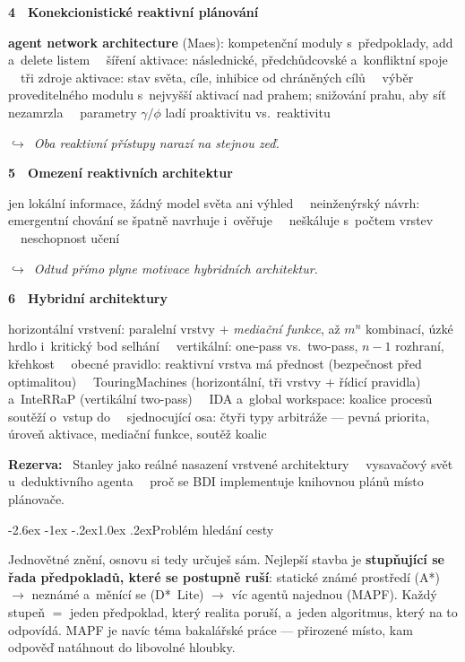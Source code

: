 \documentclass[11pt,a4paper]{article}
\makeatletter
\newcommand{\tb}{\ \textcolor{defframe}{\textbullet}\ }
\newcommand{\blok}[2]{\par\addvspace{2.4mm}\noindent
  \textcolor{blokcol}{\textbf{#1}}\ \ \textbf{#2}\par\nobreak}
\newcommand{\tema}[1]{\par\nobreak\noindent #1\par}
\newcommand{\most}[1]{\par\nobreak\noindent
  {\small\itshape\textcolor{mostcol}{$\hookrightarrow$\ #1}}\par}
\newcommand{\lbl}[1]{\par\addvspace{1.8mm}\noindent
  \textcolor{markcol}{\textbf{\small #1}}\ \ignorespaces}
\newcommand{\zneni}[1]{\par\nobreak\vspace{-1.2mm}\noindent
  {\small\itshape\uv{#1}}\par\addvspace{1.2mm}}
\renewcommand\section{\@startsection{section}{1}{\z@}%
  {-2.6ex \@plus -1ex \@minus -.2ex}{1.0ex \@plus.2ex}{\normalfont\Large\bfseries}}
\makeatother
\begin{document}
\blok{4}{Konekcionistické reaktivní plánování}
\tema{\textbf{agent network architecture} (Maes): kompetenční moduly s~předpoklady, add
a~delete listem
\tb šíření aktivace: následnické, předchůdcovské a~konfliktní spoje
\tb tři zdroje aktivace: stav světa, cíle, inhibice od chráněných cílů
\tb výběr proveditelného modulu s~nejvyšší aktivací nad prahem; snižování prahu, aby síť
nezamrzla
\tb parametry $\gamma/\phi$ ladí proaktivitu vs.\ reaktivitu}
\most{Oba reaktivní přístupy narazí na stejnou zeď.}

\blok{5}{Omezení reaktivních architektur}
\tema{jen lokální informace, žádný model světa ani výhled
\tb neinženýrský návrh: emergentní chování se špatně navrhuje i~ověřuje
\tb neškáluje s~počtem vrstev \tb neschopnost učení}
\most{Odtud přímo plyne motivace hybridních architektur.}

\blok{6}{Hybridní architektury}
\tema{horizontální vrstvení: paralelní vrstvy $+$ \emph{mediační funkce}, až $m^n$
kombinací, úzké hrdlo i~kritický bod selhání
\tb vertikální: one-pass vs.\ two-pass, $n-1$ rozhraní, křehkost
\tb obecné pravidlo: reaktivní vrstva má přednost (bezpečnost před optimalitou)
\tb TouringMachines (horizontální, tři vrstvy $+$ řídicí pravidla) a~InteRRaP (vertikální
two-pass)
\tb IDA a~global workspace: koalice procesů soutěží o~vstup do \uv{vědomí}
\tb sjednocující osa: čtyři typy arbitráže --- pevná priorita, úroveň aktivace, mediační
funkce, soutěž koalic}

\lbl{Rezerva:} Stanley jako reálné nasazení vrstvené architektury \tb vysavačový svět
u~deduktivního agenta \tb proč se BDI implementuje knihovnou plánů místo plánovače.

\section{Problém hledání cesty}
\zneni{Problém hledání cesty.}

\begin{nitbox}
Jednovětné znění, osnovu si tedy určuješ sám. Nejlepší stavba je \textbf{stupňující se řada
předpokladů, které se postupně ruší}: statické známé prostředí (A*) $\to$ neznámé a~měnící
se (D*~Lite) $\to$ víc agentů najednou (MAPF). Každý stupeň $=$ jeden předpoklad, který
realita poruší, a~jeden algoritmus, který na to odpovídá. MAPF je navíc téma bakalářské
práce --- přirozené místo, kam odpověď natáhnout do libovolné hloubky.
\end{nitbox}
\end{document}
